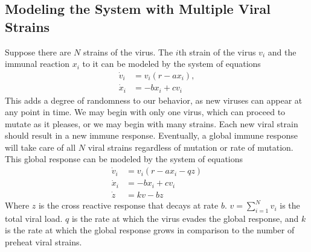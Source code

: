 \documentclass{article}
\begin{document}
\subsection{Modeling the System with Multiple Viral Strains}
Suppose there are $N$ strains of the virus.  The $i$th strain of the virus $v_i$ and the immunal reaction $x_i$ to it can be modeled by the system of equations
\begin{equation}
    \begin{split}
        \dot v_i &= v_i(r - ax_i), \\
        \dot x_i &= -bx_i + cv_i
    \end{split}
\end{equation}
This adds a degree of randomness to our behavior, as new viruses can appear at any point in time. We may begin with only one virus, which can proceed to mutate as it pleases, or we may begin with many strains. Each new viral strain should result in a new immune response. Eventually, a global immune response will take care of all $N$ viral strains regardless of mutation or rate of mutation. This global response can be modeled by the system of equations
\begin{equation}
    \begin{split}
        \dot v_i &= v_i(r - ax_i - qz) \\
        \dot x_i &= -bx_i + cv_i \\
        \dot z &= kv - bz
    \end{split}
\end{equation}
Where $z$ is the cross reactive response that decays at rate $b$.  $v = \sum^{N}_{i=1} v_i$ is the total viral load. $q$ is the rate at which the virus evades the global response, and $k$ is the rate at which the global response grows in comparison to the number of preheat viral strains.
\end{document}
